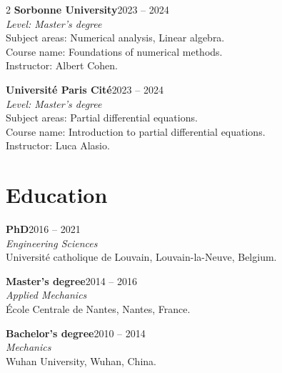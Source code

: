 \documentclass[10pt,a4paper]{article}
\newcommand{\entry}[4]{%
  \textbf{#1}\hfill{\small\color{muted}#2}\\
  \textit{#3}\\[-2pt]
  #4\par\vspace{4pt}
}
\begin{document}
\begin{paracol}{2}
\entry{Sorbonne University}{2023 -- 2024}{Level: Master's degree}{
Subject areas: Numerical analysis, Linear algebra.\\
Course name: Foundations of numerical methods.\\
Instructor: Albert Cohen.}

\entry{Universit\'e Paris Cit\'e}{2023 -- 2024}{Level: Master's degree}{
Subject areas: Partial differential equations.\\
Course name: Introduction to partial differential equations.\\
Instructor: Luca Alasio.}

\section*{Education}

\entry{PhD}{2016 -- 2021}{Engineering Sciences}{
Universit\'e catholique de Louvain, Louvain-la-Neuve, Belgium.}

\entry{Master's degree}{2014 -- 2016}{Applied Mechanics}{
\'Ecole Centrale de Nantes, Nantes, France.}

\entry{Bachelor's degree}{2010 -- 2014}{Mechanics}{
Wuhan University, Wuhan, China.}

\end{paracol}
\end{document}
